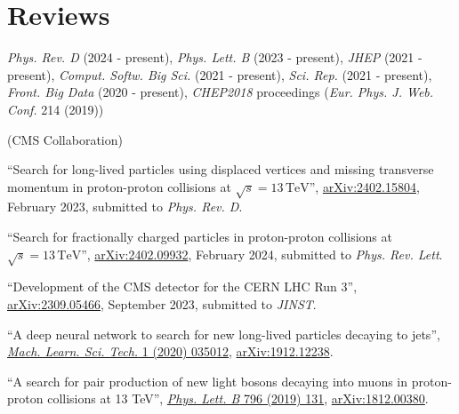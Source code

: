 \section{Reviews}
\begin{description}[leftmargin=12pt,font=\normalfont\textit]
\item[Journal referee:]
\begin{description}[leftmargin=12pt,font=\normalfont,labelsep=0em]\item[]
\item \emph{Phys. Rev. D} (2024 - present), \emph{Phys. Lett. B} (2023 - present), \emph{JHEP} (2021 - present), \emph{Comput. Softw. Big Sci.} (2021 - present), \emph{Sci. Rep.} (2021 - present), \emph{Front. Big Data} (2020 - present), \emph{CHEP2018} proceedings (\emph{Eur. Phys. J. Web. Conf.} 214 (2019))
\end{description}
\item[Analysis Review Committee (ARC) member:] (CMS Collaboration)
\begin{description}[leftmargin=12pt,font=\normalfont,labelsep=0em]
\item ``Search for long-lived particles using displaced vertices and missing transverse momentum in proton-proton collisions at $\sqrt{s} = 13\,\text{TeV}$'', \href{https://arxiv.org/abs/2402.15804}{arXiv:2402.15804}, February 2023, submitted to \emph{Phys. Rev. D}.
\item ``Search for fractionally charged particles in proton-proton collisions at $\sqrt{s} = 13\,\text{TeV}$'', \href{https://arxiv.org/abs/2402.09932}{arXiv:2402.09932}, February 2024, submitted to \emph{Phys. Rev. Lett}.
\item ``Development of the CMS detector for the CERN LHC Run 3'', \href{https://arxiv.org/abs/2309.05466}{arXiv:2309.05466}, September 2023, submitted to \emph{JINST}.
\item ``A deep neural network to search for new long-lived particles decaying to jets'', \href{https://doi.org/10.1088/2632-2153/ab9023}{\emph{Mach. Learn. Sci. Tech.} 1 (2020) 035012}, \href{https://arxiv.org/abs/1912.12238}{arXiv:1912.12238}.
\item \begin{sloppypar}``A search for pair production of new light bosons decaying into muons in proton-proton collisions at 13 TeV'', \href{http://dx.doi.org/10.1016/j.physletb.2019.07.013}{\emph{Phys. Lett. B} 796 (2019) 131}, \href{https://arxiv.org/abs/1812.00380}{arXiv:1812.00380}.\end{sloppypar}

\end{description}
\end{description}
